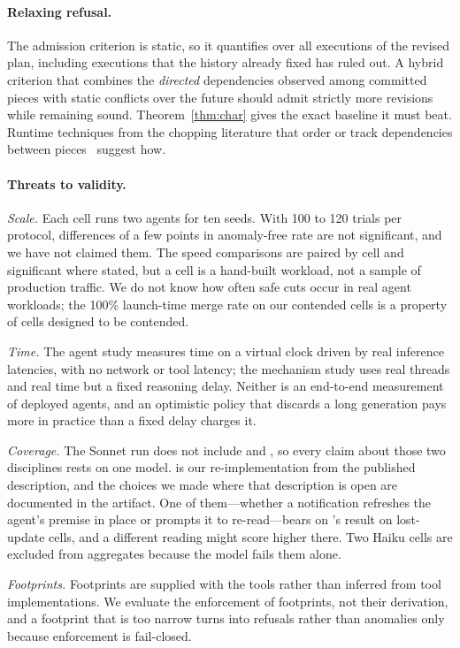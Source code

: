 \paragraph{Relaxing refusal.}
The admission criterion is static, so it quantifies over all executions of the
revised plan, including executions that the history already fixed has ruled
out. A hybrid criterion that combines the \emph{directed} dependencies
observed among committed pieces with static conflicts over the future should
admit strictly more revisions while remaining sound.
Theorem~\ref{thm:char} gives the exact baseline it must beat. Runtime
techniques from the chopping literature that order or track dependencies
between pieces~\cite{zhang2013chains,xie2015callas,wang2016ic3} suggest how.

\paragraph{Threats to validity.}
\emph{Scale.} Each cell runs two agents for ten seeds. With 100 to 120 trials
per protocol, differences of a few points in anomaly-free rate are not
significant, and we have not claimed them. The speed comparisons are paired
by cell and significant where stated, but a cell is a hand-built workload, not
a sample of production traffic. We do not know how often safe cuts occur in
real agent workloads; the 100\% launch-time merge rate on our contended cells
is a property of cells designed to be contended.

\emph{Time.} The agent study measures time on a virtual clock driven by real
inference latencies, with no network or tool latency; the mechanism study uses
real threads and real time but a fixed reasoning delay. Neither is an
end-to-end measurement of deployed agents, and an optimistic policy that
discards a long generation pays more in practice than a fixed delay charges
it.

\emph{Coverage.} The Sonnet run does not include \cctwo and \ccs, so every
claim about those two disciplines rests on one model. \mtpo is our
re-implementation from the published description, and the choices we made
where that description is open are documented in the artifact. One of
them---whether a notification refreshes the agent's premise in place or
prompts it to re-read---bears on \mtpo's result on lost-update cells, and a
different reading might score higher there. Two Haiku cells are excluded from aggregates because
the model fails them alone.

\emph{Footprints.} Footprints are supplied with the tools rather than
inferred from tool implementations. We evaluate the enforcement of footprints,
not their derivation, and a footprint that is too narrow turns into refusals
rather than anomalies only because enforcement is fail-closed.

